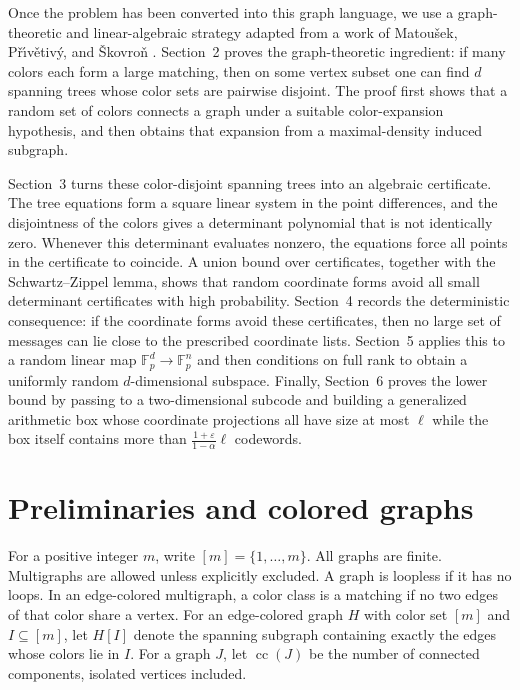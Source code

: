 \documentclass[10pt,a4paper]{amsart}
\newcommand{\Fp}{\mathbb{F}_p}
\DeclareMathOperator{\cc}{cc}
\begin{document}
Once the problem has been converted into this graph language, we use a graph-theoretic and linear-algebraic strategy adapted from a work of Matou\v{s}ek, P\v{r}\'{\i}v\v{e}tiv\'y, and \v{S}kovro\v{n} \cite{MPS}. Section~2 proves the graph-theoretic ingredient: if many colors each form a large matching, then on some vertex subset one can find $d$ spanning trees whose color sets are pairwise disjoint. The proof first shows that a random set of colors connects a graph under a suitable color-expansion hypothesis, and then obtains that expansion from a maximal-density induced subgraph.

Section~3 turns these color-disjoint spanning trees into an algebraic certificate. The tree equations form a square linear system in the point differences, and the disjointness of the colors gives a determinant polynomial that is not identically zero. Whenever this determinant evaluates nonzero, the equations force all points in the certificate to coincide. A union bound over certificates, together with the Schwartz--Zippel lemma, shows that random coordinate forms avoid all small determinant certificates with high probability. Section~4 records the deterministic consequence: if the coordinate forms avoid these certificates, then no large set of messages can lie close to the prescribed coordinate lists. Section~5 applies this to a random linear map $\Fp^d\to\Fp^n$ and then conditions on full rank to obtain a uniformly random $d$-dimensional subspace. Finally, Section~6 proves the lower bound by passing to a two-dimensional subcode and building a generalized arithmetic box whose coordinate projections all have size at most $\ell$ while the box itself contains more than $\frac{1+\varepsilon}{1-\alpha}\ell$ codewords.

\section{Preliminaries and colored graphs}

For a positive integer \(m\), write $[m]=\{1,\ldots,m\}$. 
All graphs are finite. Multigraphs are allowed unless explicitly excluded. A graph is loopless if it has no loops. In an edge-colored multigraph, a color class is a matching if no two edges of that color share a vertex. For an edge-colored graph \(H\) with color set \([m]\) and \(I\subseteq[m]\), let \(H[I]\) denote the spanning subgraph containing exactly the edges whose colors lie in \(I\). For a graph \(J\), let \(\cc(J)\) be the number of connected components, isolated vertices included.
\end{document}
